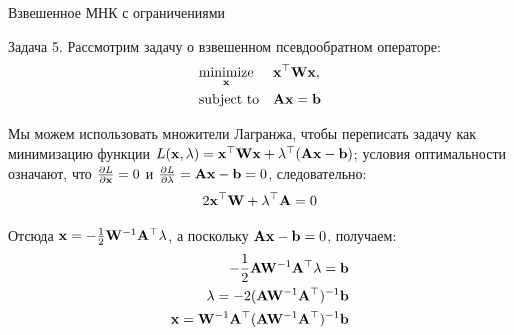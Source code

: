 \documentclass{beamer}
\begin{document}
\begin{frame}{Взвешенное МНК с ограничениями}
	\begin{flushleft}
		
		Задача 5. Рассмотрим задачу о взвешенном псевдообратном операторе:
		\begin{equation}
			\begin{aligned}
				& \underset{\mathbf{x}}{\text{minimize}}
				& & \mathbf{x}^\top \mathbf{W} \mathbf{x}, \\
				& \text{subject to}
				& & \mathbf{A}\mathbf{x}=\mathbf{b}
			\end{aligned}
		\end{equation}
		
		Мы можем использовать множители Лагранжа, чтобы переписать задачу как минимизацию функции $L(\mathbf{x}, \lambda) = \mathbf{x}^\top \mathbf{W} \mathbf{x} + \lambda^\top ( \mathbf{A}\mathbf{x}-\mathbf{b})$; условия оптимальности означают, что $\frac{\partial L}{\partial  \mathbf{x}} = 0$ и $\frac{\partial  L}{\partial  \lambda} = \mathbf{A}\mathbf{x}-\mathbf{b} = 0$, следовательно:
		\begin{align}
			2\mathbf{x}^\top \mathbf{W} + \lambda^\top \mathbf{A} = 0
		\end{align}		
		
		Отсюда $\mathbf{x} = -\frac{1}{2} \mathbf{W}^{-1} \mathbf{A}^\top \lambda$, а поскольку $\mathbf{A}\mathbf{x}-\mathbf{b} = 0$, получаем:
		\begin{align}
			-\frac{1}{2}\mathbf{A}\mathbf{W}^{-1} \mathbf{A}^\top \lambda= \mathbf{b} \\
			\lambda = -2 (\mathbf{A}\mathbf{W}^{-1} \mathbf{A}^\top)^{-1} \mathbf{b} \\
			\mathbf{x} = \mathbf{W}^{-1} \mathbf{A}^\top (\mathbf{A}\mathbf{W}^{-1} \mathbf{A}^\top)^{-1} \mathbf{b}
		\end{align}		
		
		
	\end{flushleft}
\end{frame}
\end{document}
